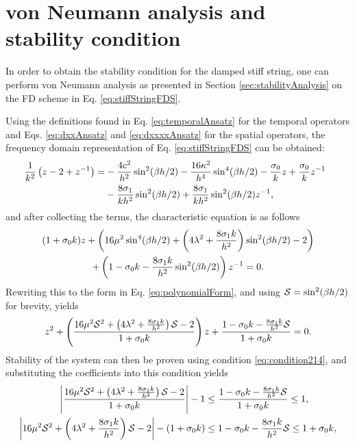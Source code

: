 {\section{von Neumann analysis and stability condition}\label{sec:stiffStringStability}
In order to obtain the stability condition for the damped stiff string, one can perform von Neumann analysis as presented in Section \ref{sec:stabilityAnalysis} on the FD scheme in Eq. \eqref{eq:stiffStringFDS}.

Using the definitions found in Eq. \eqref{eq:temporalAnsatz} for the temporal operators and Eqs. \eqref{eq:dxxAnsatz} and \eqref{eq:dxxxxAnsatz} for the spatial operators, the frequency domain representation of Eq. \eqref{eq:stiffStringFDS} can be obtained:
\begin{align*}
    \!\!\!\!\frac{1}{k^2}\left(z - 2 + z^{-1}\right) =&-\frac{4c^2}{h^2}\sin^2(\beta h/2) - \frac{16\kappa^2}{h^4}\sin^4(\beta h/2) - \frac{\sz}{k}z + \frac{\sz}{k}z^{-1}\\
    & - \frac{8 \so}{kh^2}\sin^2(\beta h/2) + \frac{8 \so}{kh^2} \sin^2(\beta h/2)z^{-1},
\end{align*}
and after collecting the terms, the characteristic equation is as follows
\begin{gather}
    (1+\sz k)z + \left(16\mu^2\sin^4(\beta h/2)+\left(4\lambda^2+\frac{8\so k}{h^2}\right)\sin^2(\beta h/2) - 2\right)\nonumber\\
    +\left(1-\sz k-\frac{8\so k}{h^2}\sin^2(\beta h/2)\right)z^{-1}=0.\label{eq:charDampedString}
\end{gather}
Rewriting this to the form in Eq. \eqref{eq:polynomialForm}, and using $\S = \sin^2(\beta h /2)$ for brevity, yields
\begin{equation*}
    z^2 + \left(\frac{16\mu^2\S^2+\left(4\lambda^2+\frac{8\so k}{h^2}\right)\S - 2}{1 + \sz k}\right)z+\frac{1-\sz k-\frac{8\so k}{h^2}\S}{1 + \sz k}=0.
\end{equation*}
Stability of the system can then be proven using condition \eqref{eq:condition214}, and substituting the coefficients into this condition yields
\begin{equation}\nonumber
    \begin{aligned}
        \left|\frac{16\mu^2\S^2+\left(4\lambda^2+\frac{8\so k}{h^2}\right)\S - 2}{1+\sz k}\right|-1 &\leq \frac{1-\sz k-\frac{8\so k}{h^2}\S}{1+\sz k}\leq 1,\\
        \left|16\mu^2\S^2+\left(4\lambda^2+\frac{8\so k}{h^2}\right)\S - 2\right|-(1+\sz k) &\leq 1-\sz k-\frac{8\so k}{h^2}\S\leq 1+\sz k,\\

\end{aligned}
\end{equation}}
